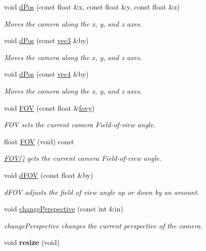 \begin{DoxyCompactItemize}
void \hyperlink{class_camera_a2ac5f89b4f9f012dead66980925143c0}{d\-Pos} (const float \&x, const float \&y, const float \&z)
\begin{DoxyCompactList}\small\item\em Moves the camera along the x, y, and z axes. \end{DoxyCompactList}\item 
void \hyperlink{class_camera_a928de59670f0b31264307a8a0888b99d}{d\-Pos} (const \hyperlink{struct_angel_1_1vec3}{vec3} \&by)
\begin{DoxyCompactList}\small\item\em Moves the camera along the x, y, and z axes. \end{DoxyCompactList}\item 
void \hyperlink{class_camera_a4ec2e3d2a66826aedb1ac1eee7da0b96}{d\-Pos} (const \hyperlink{struct_angel_1_1vec4}{vec4} \&by)
\begin{DoxyCompactList}\small\item\em Moves the camera along the x, y, and z axes. \end{DoxyCompactList}\item 
void \hyperlink{class_camera_ac325bf616014d2e6023b84b6224630ac}{F\-O\-V} (const float \&\hyperlink{class_camera_acc8b97facc57059530efad534c2f8314}{fovy})
\begin{DoxyCompactList}\small\item\em F\-O\-V sets the current camera Field-\/of-\/view angle. \end{DoxyCompactList}\item 
float \hyperlink{class_camera_a8817ea073431268d8c0e522cdc30026c}{F\-O\-V} (void) const 
\begin{DoxyCompactList}\small\item\em \hyperlink{class_camera_a8817ea073431268d8c0e522cdc30026c}{F\-O\-V()} gets the current camera Field-\/of-\/view angle. \end{DoxyCompactList}\item 
void \hyperlink{class_camera_a55355b3376d195b17adcc6a5b72ae07b}{d\-F\-O\-V} (const float \&by)
\begin{DoxyCompactList}\small\item\em d\-F\-O\-V adjusts the field of view angle up or down by an amount. \end{DoxyCompactList}\item 
void \hyperlink{class_camera_ad388a5f75af8f2289447b716c8c839ff}{change\-Perspective} (const int \&in)
\begin{DoxyCompactList}\small\item\em change\-Perspective changes the current perspective of the camera. \end{DoxyCompactList}\item 
\hypertarget{class_camera_ac53439295f09b899dceea810a6d9afa4}{void {\bfseries resize} (void)}\label{class_camera_ac53439295f09b899dceea810a6d9afa4}


\end{DoxyCompactItemize}
